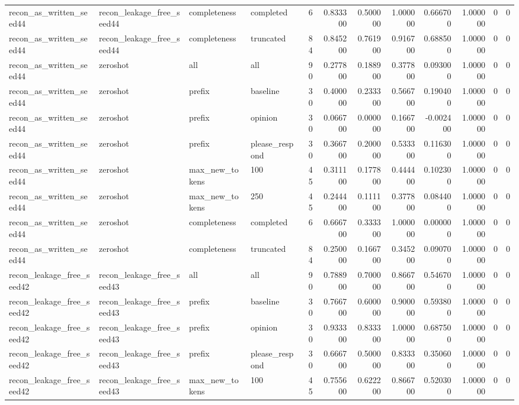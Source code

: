 \begin{tabular}{llllrrrrrrrr}
recon_as_written_seed44 & recon_leakage_free_seed44 & completeness & completed & 6 & 0.833300 & 0.500000 & 1.000000 & 0.666700 & 1.000000 & 0 & 0 \\
recon_as_written_seed44 & recon_leakage_free_seed44 & completeness & truncated & 84 & 0.845200 & 0.761900 & 0.916700 & 0.688500 & 1.000000 & 0 & 0 \\
recon_as_written_seed44 & zeroshot & all & all & 90 & 0.277800 & 0.188900 & 0.377800 & 0.093000 & 1.000000 & 0 & 0 \\
recon_as_written_seed44 & zeroshot & prefix & baseline & 30 & 0.400000 & 0.233300 & 0.566700 & 0.190400 & 1.000000 & 0 & 0 \\
recon_as_written_seed44 & zeroshot & prefix & opinion & 30 & 0.066700 & 0.000000 & 0.166700 & -0.002400 & 1.000000 & 0 & 0 \\
recon_as_written_seed44 & zeroshot & prefix & please_respond & 30 & 0.366700 & 0.200000 & 0.533300 & 0.116300 & 1.000000 & 0 & 0 \\
recon_as_written_seed44 & zeroshot & max_new_tokens & 100 & 45 & 0.311100 & 0.177800 & 0.444400 & 0.102300 & 1.000000 & 0 & 0 \\
recon_as_written_seed44 & zeroshot & max_new_tokens & 250 & 45 & 0.244400 & 0.111100 & 0.377800 & 0.084400 & 1.000000 & 0 & 0 \\
recon_as_written_seed44 & zeroshot & completeness & completed & 6 & 0.666700 & 0.333300 & 1.000000 & 0.000000 & 1.000000 & 0 & 0 \\
recon_as_written_seed44 & zeroshot & completeness & truncated & 84 & 0.250000 & 0.166700 & 0.345200 & 0.090700 & 1.000000 & 0 & 0 \\
recon_leakage_free_seed42 & recon_leakage_free_seed43 & all & all & 90 & 0.788900 & 0.700000 & 0.866700 & 0.546700 & 1.000000 & 0 & 0 \\
recon_leakage_free_seed42 & recon_leakage_free_seed43 & prefix & baseline & 30 & 0.766700 & 0.600000 & 0.900000 & 0.593800 & 1.000000 & 0 & 0 \\
recon_leakage_free_seed42 & recon_leakage_free_seed43 & prefix & opinion & 30 & 0.933300 & 0.833300 & 1.000000 & 0.687500 & 1.000000 & 0 & 0 \\
recon_leakage_free_seed42 & recon_leakage_free_seed43 & prefix & please_respond & 30 & 0.666700 & 0.500000 & 0.833300 & 0.350600 & 1.000000 & 0 & 0 \\
recon_leakage_free_seed42 & recon_leakage_free_seed43 & max_new_tokens & 100 & 45 & 0.755600 & 0.622200 & 0.866700 & 0.520300 & 1.000000 & 0 & 0 \\

\end{tabular}
